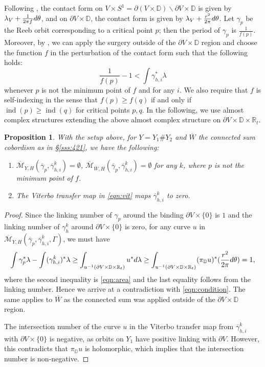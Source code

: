 \documentclass[reqno,11pt]{amsart}
\numberwithin{equation}{section}
\newtheorem{proposition}[theorem]{\textbf{Proposition}}
\def\R{\mathbb{R}}
\def\D{{\mathbb D}}
\def\cM{{\mathcal M}}
\def\rd{{\rm d}}
\DeclareMathOperator{\ind}{ind}
\begin{document}
Following \cite[\S 2.1]{zbMATH07673358}, the contact form on $V\times S^1 = \partial(V\times \D)\backslash \partial V \times \D $ is given by 
$\lambda_V +\frac{1}{2\pi f} \rd \theta$, and on $\partial V\times \D$, the contact form is given by $\lambda_V+\frac{r^2}{2\pi}\rd \theta$. Let $\gamma_p$ be the Reeb orbit corresponding to a critical point $p$; then the period of $\gamma_p$ is $\frac{1}{f(p)}$. Moreover, by \cite[Lemma 4.6]{bowden2022making}, we can apply the surgery outside of the $\partial V\times \D$ region and choose the function $f$ in the perturbation of the contact form such that the following holds:
\begin{equation}\label{eqn:condition}
    \frac{1}{f(p)}-1<\int \gamma_{h,i}^*\lambda
\end{equation}
whenever $p$ is not the minimum point of $f$ and for any $i$. We also require that $f$ is self-indexing in the sense that $f(p)\ge f(q)$ if and only if $\ind(p)\ge \ind (q)$ for critical points $p,q$. In the following, we use almost complex structures extending the above almost complex structure on $\partial V \times \D \times \R_t$.

\begin{proposition}\label{prop:area}
    With the setup above, for $Y=Y_1\#Y_2$ and $\overline{W}$ the connected sum cobordism as in \S \ref{sss:421}, we have the following:
    \begin{enumerate}
        \item\label{a1} $\overline{\cM}_{Y,H}(\overline{\gamma}_p,\overline{\gamma}_{h,i}^k)=\emptyset$, $\overline{\cM}_{\overline{W},H}(\overline{\gamma}_p,\overline{\gamma}_{h,i}^k)=\emptyset$ for any $k$, where $p$ is not the minimum point of $f$.
        \item\label{a2}  The Viterbo transfer map in \eqref{eqn:vit} maps $\overline{\gamma}_{h,i}^k$ to zero.
    \end{enumerate}
\end{proposition}
\begin{proof}
     Since the linking number of $\gamma_p$ around the binding $\partial V\times\{0\}$ is $1$ and the linking number of $\gamma_h^k$ around $\partial V\times \{0\}$ is zero, for any curve $u$ in $\overline{\cM}_{Y,H}(\overline{\gamma}_p,\overline{\gamma}_{h,i}^k,\Gamma)$, we must have 
     $$\int \gamma_p^*\lambda-\int(\gamma_{h,i}^k)^*\lambda\ge \int_{u^{-1}(\partial V \times \D \times \R_t)}u^*\rd \lambda\ge \int_{u^{-1}(\partial V \times \D \times \R_t)}(\pi_{\D}u)^*(\frac{r^2}{2\pi}\rd \theta)=1,$$
     where the second inequality is \eqref{eqn:area} and the last equality follows from the linking number. Hence we arrive at a contradiction with \eqref{eqn:condition}. The same applies to $\overline{W}$ as the connected sum was applied outside of the $\partial V\times \D$ region.

    The intersection number of the curve $u$ in the Viterbo transfer map from $\overline{\gamma}_{h,i}^k$ with $\partial V \times \{0\}$ is negative, as orbits on $Y_1$ have positive linking with $\partial V$. However, this contradicts that $\pi_{\D}u$ is holomorphic, which implies that the intersection number is non-negative.  
\end{proof}
\end{document}
